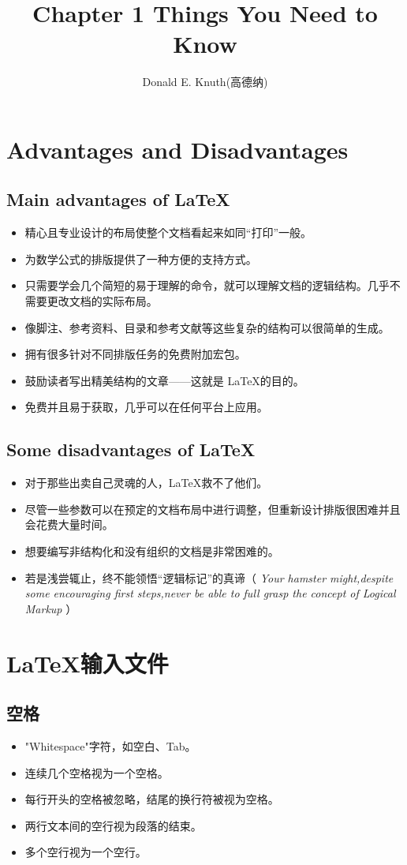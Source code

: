 \documentclass[UTF8]{ctexart}
\title{\heiti Chapter 1 Things You Need to Know}
\author{ Donald E. Knuth(高德纳)}
\begin{document}
\maketitle
\section{Advantages and Disadvantages}
\subsection{Main advantages of \LaTeX}
\begin{itemize}
  \item 精心且专业设计的布局使整个文档看起来如同“打印”一般。
  \item 为数学公式的排版提供了一种方便的支持方式。
  \item 只需要学会几个简短的易于理解的命令，就可以理解文档的逻辑结构。几乎不需要更改文档的实际布局。
  \item 像脚注、参考资料、目录和参考文献等这些复杂的结构可以很简单的生成。
  \item 拥有很多针对不同排版任务的免费附加宏包。
  \item 鼓励读者写出精美结构的文章——这就是 \LaTeX 的目的。
  \item 免费并且易于获取，几乎可以在任何平台上应用。
\end{itemize}
\subsection{Some disadvantages of \LaTeX}
\begin{itemize}
  \item 对于那些出卖自己灵魂的人，\LaTeX 救不了他们。
  \item 尽管一些参数可以在预定的文档布局中进行调整，但重新设计排版很困难并且会花费大量时间。
  \item 想要编写非结构化和没有组织的文档是非常困难的。
  \item 若是浅尝辄止，终不能领悟“逻辑标记”的真谛（\emph{ Your hamster might,despite some encouraging first steps,never be able to full grasp the concept of Logical Markup } ）
\end{itemize}

\section{\LaTeX 输入文件}
\subsection{空格}
\begin{itemize}
  \item "Whitespace"字符，如空白、Tab。
  \item 连续几个空格视为一个空格。
  \item 每行开头的空格被忽略，结尾的换行符被视为空格。
  \item 两行文本间的空行视为段落的结束。
  \item 多个空行视为一个空行。
\end{itemize}
\end{document}
